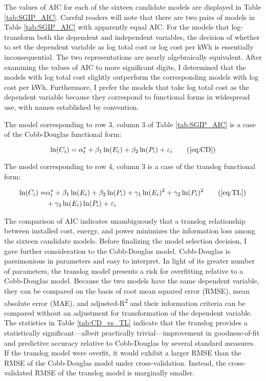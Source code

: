 The values of AIC for each of the sixteen candidate models are displayed in Table \ref{tab:SGIP_AIC}. Careful readers will note that there are two pairs of models in Table \ref{tab:SGIP_AIC} with apparently equal AIC. For the models that log-transform both the dependent and independent variables, the decision of whether to set the dependent variable as log total cost or log cost per kWh is essentially inconsequential. The two representations are nearly algebraically equivalent. After examining the values of AIC to more significant digits, I determined that the models with log total cost slightly outperform the corresponding models with log cost per kWh. Furthermore, I prefer the models that take log total cost as the dependent variable because they correspond to functional forms in widespread use, with names established by convention.

The model corresponding to row 3, column 3 of Table \ref{tab:SGIP_AIC} is a case of the Cobb-Douglas \citep{cobbdouglas1928} functional form:

\begin{equation}
    \ln(C_i) = \alpha^{s}_{t} + \beta_1 \ln(E_i) + \beta_2 \ln(P_i) + \varepsilon_i \tag{\ref{eq:CD}}
\end{equation}

The model corresponding to row 4, column 3 is a case of the translog \citep{kmenta1967} functional form:

\begin{align}
    \ln(C_i) = &\alpha^{s}_{t} + \beta_1 \ln(E_i) + \beta_2 \ln(P_i) + \gamma_1 \ln(E_i)^2 + \gamma_2 \ln(P_i)^2 \tag{\ref{eq:TL}} \\
		 & + \gamma_3 \ln(E_i) \ln(P_i) + \varepsilon_i \notag
\end{align}

The comparison of AIC indicates unambiguously that a translog relationship between installed cost, energy, and power minimizes the information loss among the sixteen candidate models. Before finalizing the model selection decision, I gave further consideration to the Cobb-Douglas model. Cobb-Douglas is parsimonious in parameters and easy to interpret. In light of its greater number of parameters, the translog model presents a risk for overfitting relative to a Cobb-Douglas model. Because the two models have the same dependent variable, they can be compared on the basis of root mean squared error (RMSE), mean absolute error (MAE), and adjusted-R\textsuperscript{2} and their information criteria can be compared without an adjustment for transformation of the dependent variable. The statistics in Table \ref{tab:CD_vs_TL} indicate that the translog provides a statistically significant---albeit practically trivial---improvement in goodness-of-fit and predictive accuracy relative to Cobb-Douglas by several standard measures. If the translog model were overfit, it would exhibit a larger RMSE than the RMSE of the Cobb-Douglas model under cross-validation. Instead, the cross-validated RMSE of the translog model is marginally smaller.

